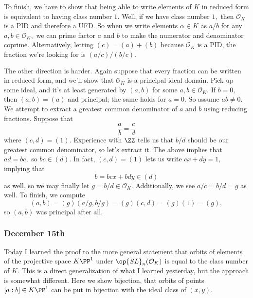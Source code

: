 To finish, we have to show that being able to write elements of $K$ in reduced form is equivalent to having class number $1.$ Well, if we have class number $1,$ then $\mathcal O_K$ is a PID and therefore a UFD. So when we write elements $\alpha\in K$ as $a/b$ for any $a,b\in\mathcal O_K,$ we can prime factor $a$ and $b$ to make the numerator and denominator coprime. Alternatively, letting $(c)=(a)+(b)$ because $\mathcal O_K$ is a PID, the fraction we're looking for is $(a/c)/(b/c).$

The other direction is harder. Again suppose that every fraction can be written in reduced form, and we'll show that $\mathcal O_K$ is a principal ideal domain. Pick up some ideal, and it's at least generated by $(a,b)$ for some $a,b\in\mathcal O_K.$ If $b=0,$ then $(a,b)=(a)$ and principal; the same holds for $a=0.$ So assume $ab\ne0.$ We attempt to extract a greatest common denominator of $a$ and $b$ using reducing fractions. Suppose that
\[\frac ab=\frac cd\]
where $(c,d)=(1).$ Experience with $\ZZ$ tells us that $b/d$ should be our greatest common denominator, so let's extract it. The above implies that $ad=bc,$ so $bc\in(d).$ In fact, $(c,d)=(1)$ lets us write $cx+dy=1,$ implying that
\[b=bcx+bdy\in(d)\]
as well, so we may finally let $g=b/d\in\mathcal O_K.$ Additionally, we see $a/c=b/d=g$ as well. To finish, we compute
\[(a,b)=(g)(a/g,b/g)=(g)(c,d)=(g)(1)=(g),\]
so $(a,b)$ was principal after all.

\subsubsection{December 15th}
Today I learned the proof to the more general statement that orbits of elements of the projective space $K\PP^1$ under $\op{SL}_n(\mathcal O_K)$ is equal to the class number of $K.$ This is a direct generalization of what I learned yesterday, but the approach is somewhat different. Here we show bijection, that orbits of points $[a:b]\in K\PP^1$ can be put in bijection with the ideal class of $(x,y).$

